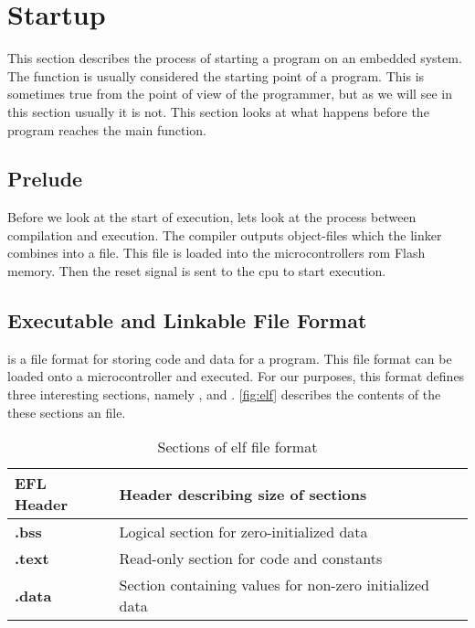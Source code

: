 \section{Startup}
\label{sec:back:startup}

This section describes the process of starting a program on an embedded system.
The {\main} function is usually considered the starting point of a program.
This is sometimes true from the point of view of the programmer, but as we will see in this section usually it is not.
This section looks at what happens before the program reaches the main function.

\subsection{Prelude}

Before we look at the start of execution, lets look at the process between compilation and execution.
The compiler outputs object-files which the linker combines into a {\elf} file.
This file is loaded into the microcontrollers \gls{rom} Flash memory.
Then the reset signal is sent to the \gls{cpu} to start execution.

\subsection{Executable and Linkable File Format}
\elf is a file format for storing code and data for a program.
This file format can be loaded onto a microcontroller and executed.
For our purposes, this format defines three interesting sections, namely ,  and .
\autoref{fig:elf} describes the contents of the these sections an {\elf} file.

\begin{table}[H]
  \centering
  \begin{tabular}{|l|l|}
    \hline
    EFL Header & Header describing size of sections \\
    \hline
    \textbf{.bss} & Logical section for zero-initialized data \\
    \hline
    \textbf{.text} & Read-only section for code and constants \\
    \hline
    \textbf{.data} & Section containing values for non-zero initialized data \\
    \hline
  \end{tabular}
  \caption{Sections of elf file format}
  \label{fig:elf}
\end{table}

